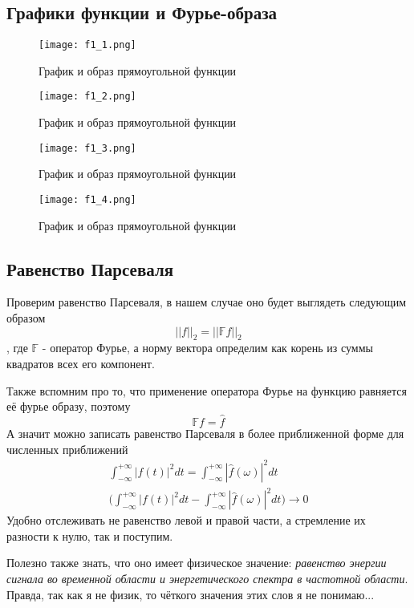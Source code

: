 \subsection{Графики функции и Фурье-образа}


\begin{figure}[ht]
    \centering
    \texttt{[image: f1\_1.png]}
    \caption{График и образ прямоугольной функции}
\end{figure}

\begin{figure}[ht]
    \centering
    \texttt{[image: f1\_2.png]}
    \caption{График и образ прямоугольной функции}
\end{figure}

\begin{figure}[ht]
    \centering
    \texttt{[image: f1\_3.png]}
    \caption{График и образ прямоугольной функции}
\end{figure}

\begin{figure}[ht]
    \centering
    \texttt{[image: f1\_4.png]}
    \caption{График и образ прямоугольной функции}
\end{figure}
\newpage
\subsection{Равенство Парсеваля}

Проверим равенство Парсеваля, в нашем случае оно будет выглядеть следующим образом
$$
||f||_2 = ||\mathbb{F}f||_2
$$, где $\mathbb{F}$ - оператор Фурье, а норму вектора определим как корень из суммы квадратов всех его компонент.

Также вспомним про то, что применение оператора Фурье на функцию равняется её фурье образу, поэтому
$$
\mathbb{F}f = \hat{f}
$$ А значит можно записать равенство Парсеваля в более приближенной форме для численных приближений
\begin{align*}
    \int_{-\infty}^{+\infty}|f(t)|^2dt = \int_{-\infty}^{+\infty}|\hat{f}(\omega)|^2dt \\
    \bigg(  \int_{-\infty}^{+\infty}|f(t)|^2dt - \int_{-\infty}^{+\infty}|\hat{f}(\omega)|^2dt \bigg) \rightarrow 0
\end{align*}
Удобно отслеживать не равенство левой и правой части, а стремление их разности к нулю, так и поступим.

Полезно также знать, что оно имеет физическое значение: \textit{равенство энергии сигнала во временной области и энергетического спектра в частотной области}.
Правда, так как я не физик, то чёткого значения этих слов я не понимаю...


